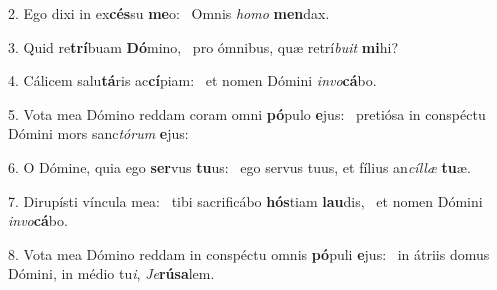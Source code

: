 2. Ego dixi in ex\textbf{cés}su \textbf{me}o: \ast\  Omnis \textit{ho}\textit{mo} \textbf{men}dax.\

3. Quid re\textbf{trí}buam \textbf{Dó}mino, \ast\  pro ómnibus, quæ retrí\textit{bu}\textit{it} \textbf{mi}hi?\

4. Cálicem salu\textbf{tá}ris ac\textbf{cí}piam: \ast\  et nomen Dómini \textit{in}\textit{vo}\textbf{cá}bo.\

5. Vota mea Dómino reddam coram omni \textbf{pó}pulo \textbf{e}jus: \ast\  pretiósa in conspéctu Dómini mors sanc\textit{tó}\textit{rum} \textbf{e}jus:\

6. O Dómine, quia ego \textbf{ser}vus \textbf{tu}us: \ast\  ego servus tuus, et fílius an\textit{cíl}\textit{læ} \textbf{tu}æ.\

7. Dirupísti víncula mea: \dag\  tibi sacrificábo \textbf{hós}tiam \textbf{lau}dis, \ast\  et nomen Dómini \textit{in}\textit{vo}\textbf{cá}bo.\

8. Vota mea Dómino reddam in conspéctu omnis \textbf{pó}puli \textbf{e}jus: \ast\  in átriis domus Dómini, in médio tu\textit{i}, \textit{Je}\textbf{rú}\textbf{sa}lem.\

